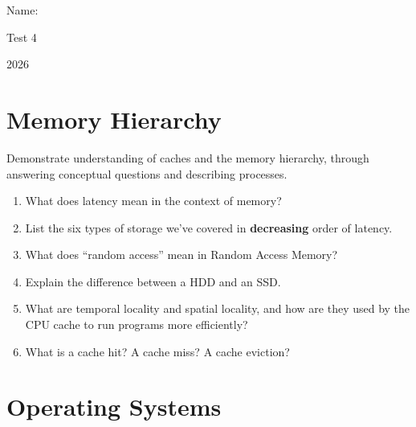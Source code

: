 \documentclass[12pt]{article}
\begin{document}
Name: \makebox[3in]{\hrulefill
\hrulefill}

\vfill

\begin{center}
{\huge Test 4}

{\large 2026}
\end{center}

\testrules

\vfill

\pledge

\newpage

\section*{Memory Hierarchy}

Demonstrate understanding of caches and the memory hierarchy, through answering conceptual questions and describing processes.\\


\begin{enumerate}

\item What does latency mean in the context of memory?
\vfill

\item List the six types of storage we've covered in \textbf{decreasing} order of latency.
\vfill

\item What does ``random access'' mean in Random Access Memory?
\vfill



\newpage
\item Explain the difference between a HDD and an SSD.
\vfill

\item What are temporal locality and spatial locality, and how are they used by the CPU cache to run programs more efficiently?
\vfill

\item What is a cache hit? A cache miss? A cache eviction?
\vfill




\end{enumerate}

\standardsfooter

\newpage

\section*{Operating Systems}
\end{document}
